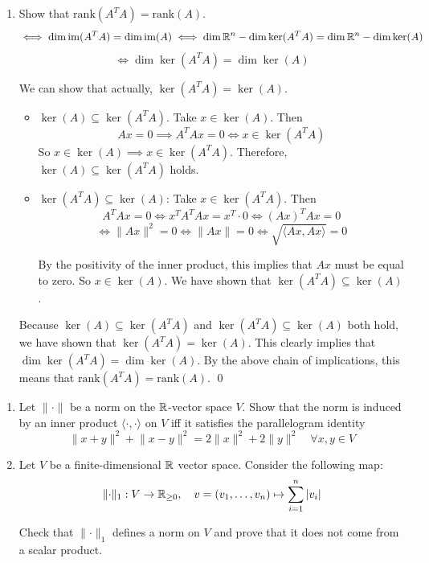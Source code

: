 \documentclass[12pt]{article}
\begin{document}
\begin{enumerate}[label=\alph*)]
    \item Show that $\mathrm{rank}(A^T A) = \mathrm{rank}(A)$.
    $$
        \iff \dim\operatorname{im}(A^T A) = \dim\operatorname{im}(A) \iff \dim\mathbb{R}^n - \dim\ker(A^T A) = \dim\mathbb{R}^n - \dim\ker(A)
    $$
    $$
        \iff \dim\ker(A^T A) = \dim\ker(A)
    $$

    We can show that actually, $\ker(A^T A) = \ker(A)$.

    \begin{itemize}
        \item \underline{$\ker(A) \subseteq \ker(A^T A)$}. Take $x \in \ker(A)$. Then
        $$
            A x = 0 \implies A^T A x = 0 \iff x \in \ker(A^T A)
        $$
        So $x \in \ker(A) \implies x \in \ker(A^T A)$. Therefore, $\ker(A) \subseteq \ker(A^T A)$ holds.
        \item \underline{$\ker(A^T A) \subseteq \ker(A)$}: Take $x \in \ker(A^T A)$. Then
        $$
            A^T A x = 0 \iff x^T A^T A x = x^T \cdot 0 \iff (A x)^T A x = 0
        $$
        $$
            \iff \lVert A x \rVert^2 = 0 \iff \lVert A x \rVert = 0 \iff \sqrt{\langle A x, A x \rangle} = 0
        $$

        By the positivity of the inner product, this implies that $A x$ must be equal to zero. So $x \in \ker(A)$. We have shown that $\ker(A^T A) \subseteq \ker(A)$.
    \end{itemize}

    Because $\ker(A) \subseteq \ker(A^T A)$ and $\ker(A^T A) \subseteq \ker(A)$ both hold, we have shown that $\ker(A^T A) = \ker(A)$. This clearly implies that $\dim\ker(A^T A) = \dim\ker(A)$. By the above chain of implications, this means that $\mathrm{rank}(A^T A) = \mathrm{rank}(A)$. \qed
\end{enumerate}

\begin{problem}{}{}
    \begin{enumerate}[label=\alph*)]
        \item Let $\lVert \cdot \rVert$ be a norm on the $\mathbb{R}$-vector space $V$. Show that the norm is induced by an inner product $\langle \cdot, \cdot \rangle$ on $V$ iff it satisfies the parallelogram identity
        $$
            \lVert x + y \rVert^2 + \lVert x - y \rVert^2 = 2 \lVert x \rVert^2 + 2 \lVert y \rVert^2 \quad \forall x, y \in V
        $$
        \item Let $V$ be a finite-dimensional $\mathbb{R}$ vector space. Consider the following map:
        $$
            \lVert \cdot \rVert_1: V \rightarrow \mathbb{R}_{\geq 0}, \quad v = (v_1,\dots,v_n) \mapsto \sum_{i = 1}^{n} |v_i|
        $$

        Check that $\lVert \cdot \rVert_1$ defines a norm on $V$ and prove that it does not come from a scalar product.
    \end{enumerate}
\end{problem}
\end{document}

